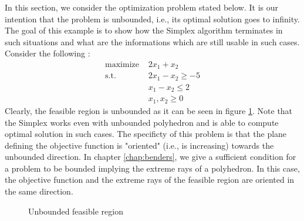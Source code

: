In this section, we consider the optimization problem stated below. It is our intention that the problem is unbounded, i.e., its optimal solution goes to infinity. The goal of this example is to show how the Simplex algorithm terminates in such situations and what are the informations which are still usable in such cases. Consider the following :
\begin{align*}
    \textrm{maximize } & 2x_1 + x_2\\
    \textrm{s.t. } & 2x_1 - x_2 \ge -5\\
    & x_1 - x_2 \le 2\\
    & x_1, x_2\ge 0
\end{align*}
Clearly, the feasible region is unbounded as it can be seen in figure \ref{fig:unbounded_simplex}. Note that the Simplex works even with unbounded polyhedron and is able to compute optimal solution in such cases. The specificty of this problem is that the plane defining the objective function is "oriented" (i.e., is increasing) towards the unbounded direction. In chapter \ref{chap:benders}, we give a sufficient condition for a problem to be bounded implying the extreme rays of a polyhedron. In this case, the objective function and the extreme rays of the feasible region are oriented in the same direction. 

\begin{figure}[h!]
    \centering
    \caption{Unbounded feasible region}
    \label{fig:unbounded_simplex}
\end{figure}


